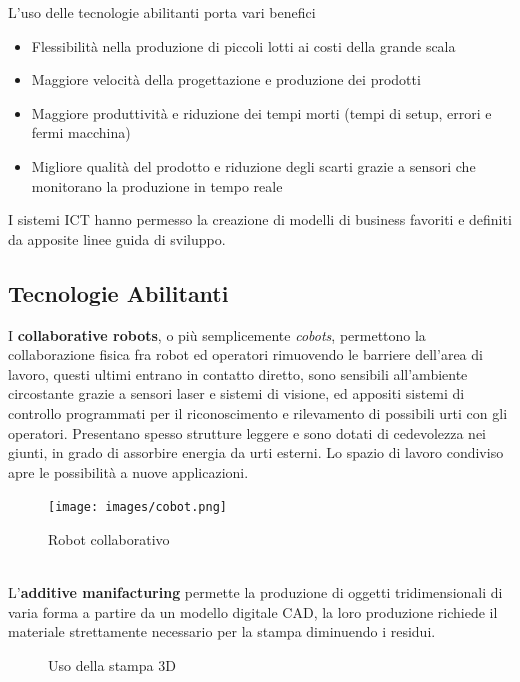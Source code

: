 \documentclass[10pt, letterpaper]{report}
\begin{document}
L'uso delle tecnologie abilitanti porta vari benefici\begin{itemize}
    \item Flessibilità nella produzione di piccoli lotti ai costi della grande scala 
    \item Maggiore velocità della progettazione e produzione dei prodotti 
    \item Maggiore produttività e riduzione dei tempi morti (tempi di setup, errori e fermi macchina)
    \item Migliore qualità del prodotto e riduzione degli scarti grazie a sensori che monitorano la produzione in tempo reale  
\end{itemize}
I sistemi ICT hanno permesso la creazione di modelli di business favoriti e definiti da 
apposite linee guida di sviluppo.\subsection{Tecnologie Abilitanti}
I \textbf{collaborative robots}, o più semplicemente \textit{cobots}, permettono la collaborazione 
fisica fra robot ed operatori rimuovendo le barriere dell'area di lavoro, questi ultimi entrano in contatto 
diretto, sono sensibili all'ambiente circostante grazie a sensori laser e sistemi di visione, ed appositi sistemi di controllo programmati 
per il riconoscimento e rilevamento di possibili urti con gli operatori. Presentano spesso strutture leggere e sono 
dotati di cedevolezza nei giunti, in grado di assorbire energia da urti esterni. Lo spazio di lavoro condiviso apre 
le possibilità a nuove applicazioni. \\\begin{figure}[h!]
    \centering
    \texttt{[image: images/cobot.png]}
    \caption{Robot collaborativo}
\end{figure}\\
L'\textbf{additive manifacturing} permette la produzione di oggetti tridimensionali di varia forma a partire da 
un modello digitale CAD, la loro produzione richiede il materiale strettamente necessario per la stampa diminuendo i 
residui.\\\begin{figure}[h!]
    \centering
    \caption{Uso della stampa 3D}
\end{figure}\\
\end{document}
